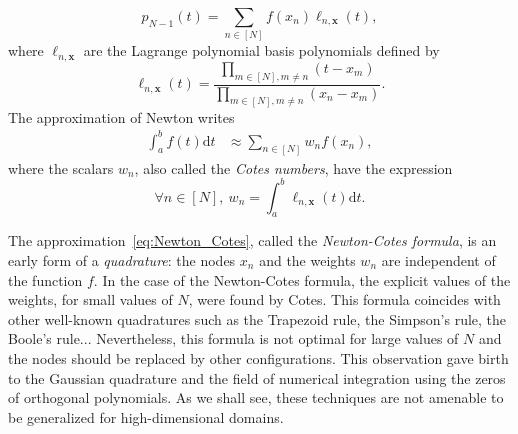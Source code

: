 \documentclass[twoside,11pt]{book}
\numberwithin{theorem}{chapter}
\numberwithin{definition}{chapter}
\numberwithin{proposition}{chapter}
\numberwithin{corollary}{chapter}
\numberwithin{example}{chapter}
\numberwithin{lemma}{chapter}
\DeclareMathOperator{\X}{\mathcal{X}}
\begin{document}
\begin{equation}
p_{N-1}(t) = \sum\limits_{n \in [N]} f(x_{n}) \ell_{n,\bm{x}}(t),
\end{equation}
where $\ell_{n,\bm{x}}$ are the Lagrange polynomial basis polynomials defined by
\begin{equation}
\ell_{n,\bm{x}}(t) = \frac{\prod\limits_{m \in [N], m \neq n }(t-x_{m})}{\prod\limits_{m \in [N], m \neq n }(x_{n}-x_{m})}.
\end{equation}
The approximation of Newton writes
\begin{align}\label{eq:Newton_Cotes}
\int_{a}^{b}f(t)\mathrm{d}t & \approx  \sum\limits_{n \in [N]}w_{n}f(x_{n})  ,
\end{align}
where the scalars $w_{n}$, also called the \emph{Cotes numbers}, have the expression
\begin{equation}
\forall n \in [N], \: w_{n} = \int_{a}^{b} \ell_{n,\bm{x}}(t) \mathrm{d}t.
\end{equation}

The approximation~\eqref{eq:Newton_Cotes}, called the \emph{Newton-Cotes formula}, is an early form of a \emph{quadrature}: the nodes $x_{n}$ and the weights $w_{n}$ are independent of the function $f$. In the case of the Newton-Cotes formula, the explicit values of the weights, for small values of $N$, were found by Cotes. This formula coincides with other well-known quadratures such as the Trapezoid rule, the Simpson's rule, the Boole's rule... Nevertheless, this formula is not optimal for large values of $N$ and the nodes should be replaced by other configurations. This observation gave birth to the Gaussian quadrature and the field of numerical integration using the zeros of orthogonal polynomials.
As we shall see, these techniques are not amenable to be generalized for  high-dimensional domains.
\end{document}
